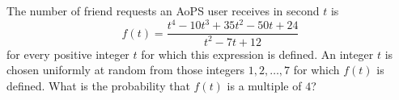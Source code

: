 The number of friend requests an AoPS user receives in second $t$ is
\[f(t)=\dfrac{t^4-10t^3+35t^2-50t+24}{t^2-7t+12}\]
for every positive integer $t$ for which this expression is defined. An integer $t$ is chosen uniformly at random from those integers $1,2,\dots,7$ for which $f(t)$ is defined. What is the probability that $f(t)$ is a multiple of $4$?
